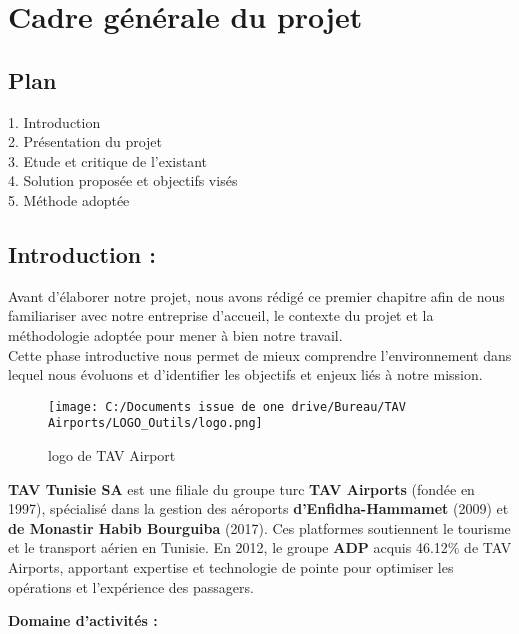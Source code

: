 \documentclass[a4paper,11pt]{report}
\begin{document}
\chapter{Cadre générale du projet }
\section*{Plan}

1. Introduction  \\
2. Présentation du projet\\
3. Etude et critique de l'existant\\
4. Solution proposée et objectifs visés \\
5. Méthode adoptée
\newpage 
\section{Introduction : }
Avant d'élaborer notre projet, nous avons rédigé ce premier chapitre afin de nous familiariser avec notre entreprise d'accueil, le contexte du projet et la méthodologie adoptée pour mener à bien notre travail.\\
Cette phase introductive nous permet de mieux comprendre l'environnement dans lequel nous évoluons et d'identifier les objectifs et enjeux liés à notre mission.
\begin{figure}[H]
\centering
\texttt{[image: C:/Documents issue de one drive/Bureau/TAV Airports/LOGO\_Outils/logo.png]}
\caption{logo de TAV Airport}
\end{figure}

\textbf{TAV Tunisie SA} est une filiale du groupe turc\textbf{ TAV Airports} (fondée en 1997), spécialisé dans la gestion des aéroports \textbf{d'Enfidha-Hammamet} (2009) et \textbf{de Monastir Habib Bourguiba} (2017).
Ces platformes soutiennent le tourisme et le transport aérien en Tunisie.
En 2012, le groupe \textbf{ADP} acquis 46.12\% de TAV Airports, apportant expertise et technologie de pointe pour optimiser les opérations et l'expérience des passagers.

\textbf{Domaine d'activités :} 
\end{document}
